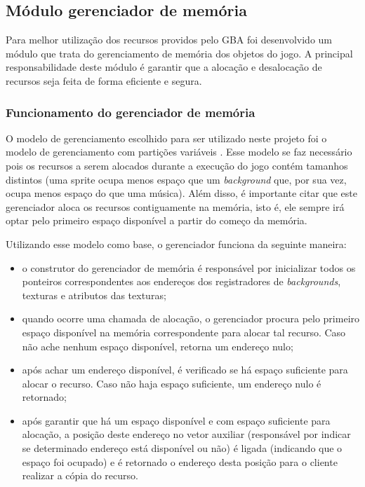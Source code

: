 \subsection{Módulo gerenciador de memória}

Para melhor utilização dos recursos providos pelo GBA foi desenvolvido um módulo que trata do gerenciamento de memória dos objetos do jogo. A principal responsabilidade deste módulo é garantir que a alocação e desalocação de recursos seja feita de forma eficiente e segura.

    \subsubsection{Funcionamento do gerenciador de memória}

    O modelo de gerenciamento escolhido para ser utilizado neste projeto foi o modelo de gerenciamento com partições variáveis \cite{tanenbaum}. Esse modelo se faz necessário pois os recursos a serem alocados durante a execução do jogo contém tamanhos distintos (uma sprite ocupa menos espaço que um \textit{background} que, por sua vez, ocupa menos espaço do que uma música). Além disso, é importante citar que este gerenciador aloca os recursos contiguamente na memória, isto é, ele sempre irá optar pelo primeiro espaço disponível a partir do começo da memória.

    Utilizando esse modelo como base, o gerenciador funciona da seguinte maneira:

    \begin{itemize}
        \item o construtor do gerenciador de memória é responsável por inicializar todos os ponteiros correspondentes aos endereços dos registradores de \textit{backgrounds}, texturas e atributos das texturas;
        \item quando ocorre uma chamada de alocação, o gerenciador procura pelo primeiro espaço disponível na memória correspondente para alocar tal recurso. Caso não ache nenhum espaço disponível, retorna um endereço nulo;
        \item após achar um endereço disponível, é verificado se há espaço suficiente para alocar o recurso. Caso não haja espaço suficiente, um endereço nulo é retornado;
        \item após garantir que há um espaço disponível e com espaço suficiente para alocação, a posição deste endereço no vetor auxiliar (responsável por indicar se determinado endereço está disponível ou não) é ligada (indicando que o espaço foi ocupado) e é retornado o endereço desta posição para o cliente realizar a cópia do recurso.
    \end{itemize}

